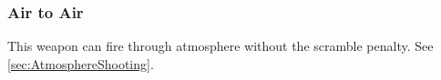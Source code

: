 \subsubsection{Air to Air}
This weapon can fire through atmosphere without the scramble penalty. See \ref{sec:AtmosphereShooting}.